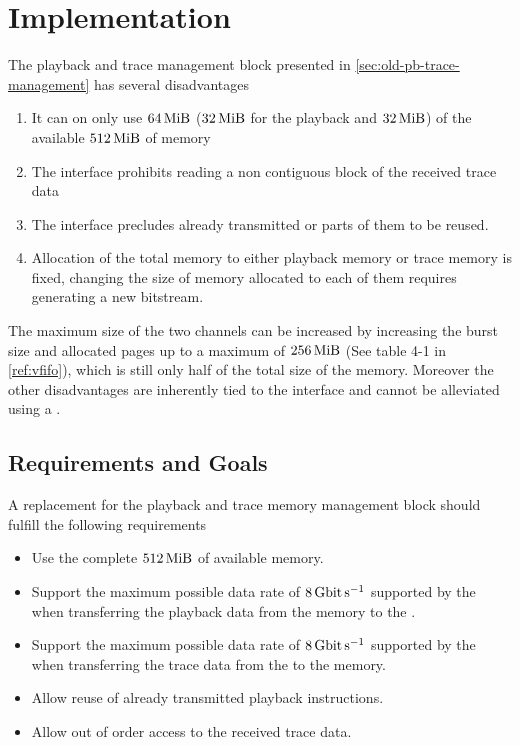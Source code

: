 \section{Implementation}
The playback and trace management block presented in \autoref{sec:old-pb-trace-management} has several disadvantages
\begin{enumerate}
  \item It can on only use \(\SI{64}{\mebi\byte}\) (\(\SI{32}{\mebi\byte}\) for the playback and \(\SI{32}{\mebi\byte}\)) of the available $\SI{512}{\mebi\byte}$ of memory\label{point:limited_size}
  \item The \FIFO{} interface prohibits reading a non contiguous block of the received trace data
  \item The \FIFO{} interface precludes already transmitted \PlaybackProgram{} or parts of them to be reused.
  \item Allocation of the total memory to either playback memory or trace memory is fixed, changing the size of memory allocated to each of them requires generating a new \FPGA{} bitstream.
\end{enumerate}
The maximum size of the two \VFIFO{} channels can be increased by increasing the burst size and allocated pages up to a maximum of \(\SI{256}{\mebi\byte}\) (See table 4-1 in \autoref{ref:vfifo}), which is still only half of the total size of the memory.
Moreover the other disadvantages are inherently tied to the \FIFO{} interface and cannot be alleviated using a \FIFO{}.

\subsection{Requirements and Goals}
A replacement for the playback and trace memory management block should fulfill the following requirements
\begin{itemize}
  \item Use the complete $\SI{512}{\mebi\byte}$ of available memory.
  \item Support the maximum possible data rate of $\pbExecBandwidth{}$ supported by the \pbexec{} when transferring the playback data from the memory to the \pbexec{}.
  \item Support the maximum possible data rate of $\pbExecBandwidth{}$ supported by the \pbexec{} when transferring the trace data from the \pbexec{} to the memory.
  \item Allow reuse of already transmitted playback instructions.
  \item Allow out of order access to the received trace data.
\end{itemize}

